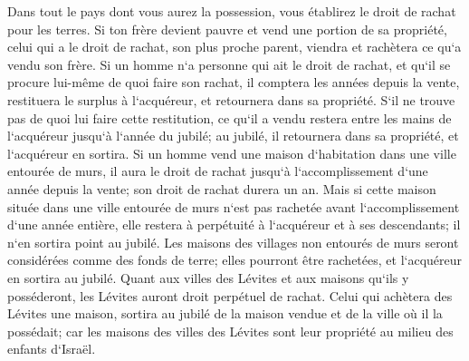 \verse Dans tout le pays dont vous aurez la possession, vous établirez le droit de rachat pour les terres. 
\verse Si ton frère devient pauvre et vend une portion de sa propriété, celui qui a le droit de rachat, son plus proche parent, viendra et rachètera ce qu`a vendu son frère. 
\verse Si un homme n`a personne qui ait le droit de rachat, et qu`il se procure lui-même de quoi faire son rachat, 
\verse il comptera les années depuis la vente, restituera le surplus à l`acquéreur, et retournera dans sa propriété. 
\verse S`il ne trouve pas de quoi lui faire cette restitution, ce qu`il a vendu restera entre les mains de l`acquéreur jusqu`à l`année du jubilé; au jubilé, il retournera dans sa propriété, et l`acquéreur en sortira. 
\verse Si un homme vend une maison d`habitation dans une ville entourée de murs, il aura le droit de rachat jusqu`à l`accomplissement d`une année depuis la vente; son droit de rachat durera un an. 
\verse Mais si cette maison située dans une ville entourée de murs n`est pas rachetée avant l`accomplissement d`une année entière, elle restera à perpétuité à l`acquéreur et à ses descendants; il n`en sortira point au jubilé. 
\verse Les maisons des villages non entourés de murs seront considérées comme des fonds de terre; elles pourront être rachetées, et l`acquéreur en sortira au jubilé. 
\verse Quant aux villes des Lévites et aux maisons qu`ils y posséderont, les Lévites auront droit perpétuel de rachat. 
\verse Celui qui achètera des Lévites une maison, sortira au jubilé de la maison vendue et de la ville où il la possédait; car les maisons des villes des Lévites sont leur propriété au milieu des enfants d`Israël. 
